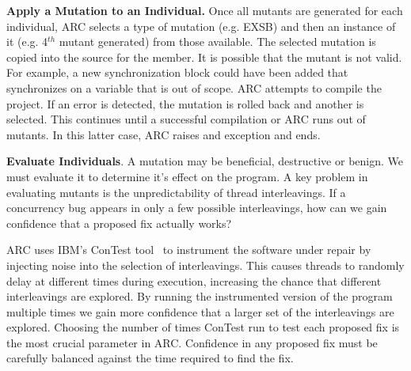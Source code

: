 \documentclass[runningheads,a4paper]{llncs}
\begin{document}

\textbf{{Apply a Mutation to an Individual}.} Once all mutants are generated for each individual, ARC selects a type of mutation (e.g. EXSB) and then an instance of it (e.g. 4$^{th}$ mutant generated) from those available. The selected mutation is copied into the source for the member. It is possible that the mutant is not valid. For example, a new synchronization block could have been added that synchronizes on a variable that is out of scope. ARC attempts to compile the project.  If an error is detected, the mutation is rolled back and another is selected. This continues until a successful compilation or ARC runs out of mutants. In this latter case, ARC raises and exception and ends.


\textbf{Evaluate Individuals}. A mutation may be beneficial, destructive or benign. We must evaluate it to determine it's effect on the program. A key problem in evaluating mutants is the unpredictability of thread interleavings. If a concurrency bug appears in only a few possible interleavings, how can we gain confidence that a proposed fix actually works? 

ARC uses IBM's ConTest tool~\cite{EFN+02} to instrument the software under repair by injecting noise into the selection of interleavings. This causes threads to randomly delay at different times during execution, increasing the chance that different interleavings are explored. By running the instrumented version of the program multiple times we gain more confidence that a larger set of the interleavings are explored. Choosing the number of times ConTest run to test each proposed fix is the most crucial parameter in ARC.  Confidence in any proposed fix must be carefully balanced against the time required to find the fix.
\end{document}

